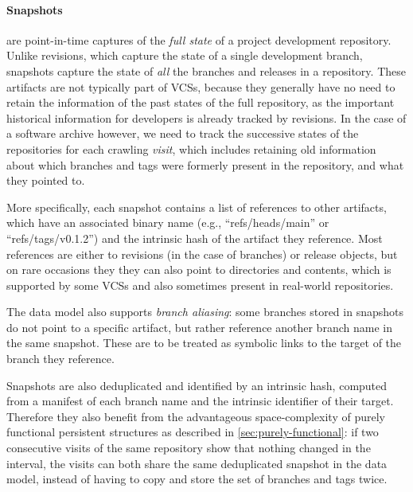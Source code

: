 \begin{figure}\centering
{}
\end{figure}
\paragraph{\textbf{Snapshots}} are point-in-time captures of the \emph{full
state} of a project development repository. Unlike revisions, which capture the
state of a single development branch, snapshots capture the state of \emph{all}
the branches and releases in a repository. These artifacts are not typically
part of \glspl{VCS}, because they generally have no need to retain the
information of the past states of the full repository, as the important
historical information for developers is already tracked by revisions. In the
case of a software archive however, we need to track the successive states of
the repositories for each crawling \emph{visit}, which includes retaining old
information about which branches and tags were formerly present in the
repository, and what they pointed to.

More specifically, each snapshot contains a list of references to other
artifacts, which have an associated binary name (e.g., ``refs/heads/main'' or
``refs/tags/v0.1.2'') and the intrinsic hash of the artifact they reference.
Most references are either to revisions (in the case of branches) or release
objects, but on rare occasions they they can also point to directories and
contents, which is supported by some \glspl{VCS} and also sometimes present in
real-world repositories.

The data model also supports \emph{branch aliasing}: some branches stored in
snapshots do not point to a specific artifact, but rather reference another
branch name in the same snapshot. These are to be treated as symbolic links to
the target of the branch they reference.

Snapshots are also deduplicated and identified by an intrinsic hash, computed
from a manifest of each branch name and the intrinsic identifier of their
target. Therefore they also benefit from the advantageous space-complexity of
purely functional persistent structures as described in
\cref{sec:purely-functional}: if two consecutive visits of the same
repository show that nothing changed in the interval, the visits can both share
the same deduplicated snapshot in the data model, instead of having to copy and
store the set of branches and tags twice.


